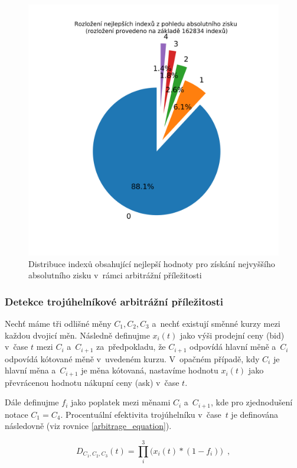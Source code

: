 \documentclass[thesis=B,czech]{FITthesis}[2019/03/21]
\begin{document}
\begin{figure}\centering
	\includegraphics[width=1\textwidth]{images/index_distribution.png}
	\caption{Distribuce indexů obsahující nejlepší hodnoty pro získání nejvyššího absolutního zisku v~rámci arbitrážní příležitosti}\label{index_distribution}
\end{figure}
\subsubsection{Detekce trojúhelníkové arbitrážní příležitosti}
Nechť máme tři odlišné měny \(C_1,C_2,C_3\) a~nechť existují směnné kurzy mezi každou dvojicí měn. Následně definujme \(x_i(t)\) jako výši prodejní ceny (bid) v~čase \(t\) mezi \(C_i\) a~\(C_{i+1}\) za~předpokladu, že \(C_{i+1}\) odpovídá hlavní měně a~\(C_{i}\) odpovídá kótované měně v~uvedeném kurzu. V~opačném případě, kdy \(C_{i}\) je hlavní měna a~\(C_{i+1}\) je měna kótovaná, nastavíme hodnotu \(x_i(t)\) jako převrácenou hodnotu nákupní ceny (ask) v~čase \(t\).

Dále definujme \(f_i\) jako poplatek mezi měnami \(C_i\) a~\(C_{i+1}\), kde pro zjednodušení notace \(C_1 = C_4\). Procentuální efektivita trojúhelníku v~čase~\(t\) je definována následovně (viz rovnice \ref{arbitrage_equation}).

\begin{equation}
\label{arbitrage_equation}
    D_{C_1,C_2,C_3}(t) = \prod_i^3\Big(x_i(t)*(1-f_i)\Big) \enspace ,
\end{equation}
\end{document}
